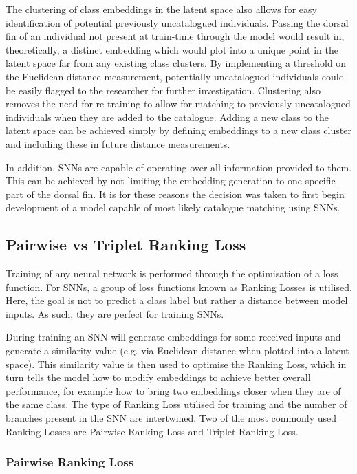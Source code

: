 The clustering of class embeddings in the latent space also allows for easy identification of potential previously uncatalogued individuals. Passing the dorsal fin of an individual not present at train-time through the model would result in, theoretically, a distinct embedding which would plot into a unique point in the latent space far from any existing class clusters. By implementing a threshold on the Euclidean distance measurement, potentially uncatalogued individuals could be easily flagged to the researcher for further investigation. Clustering also removes the need for re-training to allow for matching to previously uncatalogued individuals when they are added to the catalogue. Adding a new class to the latent space can be achieved simply by defining embeddings to a new class cluster and including these in future distance measurements.

In addition, SNNs are capable of operating over all information provided to them. This can be achieved by not limiting the embedding generation to one specific part of the dorsal fin. It is for these reasons the decision was taken to first begin development of a model capable of most likely catalogue matching using SNNs.

\subsection{Pairwise vs Triplet Ranking Loss}\label{ch:ID,sec:SNNBackground,sub:lossFunction}

Training of any neural network is performed through the optimisation of a loss function. For SNNs, a group of loss functions known as Ranking Losses is utilised. Here, the goal is not to predict a class label but rather a distance between model inputs. As such, they are perfect for training SNNs. 

During training an SNN will generate embeddings for some received inputs and generate a similarity value (e.g. via Euclidean distance when plotted into a latent space). This similarity value is then used to optimise the Ranking Loss, which in turn tells the model how to modify embeddings to achieve better overall performance, for example how to bring two embeddings closer when they are of the same class. The type of Ranking Loss utilised for training and the number of branches present in the SNN are intertwined. Two of the most commonly used Ranking Losses are Pairwise Ranking Loss and Triplet Ranking Loss.

\subsubsection{Pairwise Ranking Loss}\label{ch:ID,sec:SNNBackground,sub:lossFunction,subsub:Pairwise}

